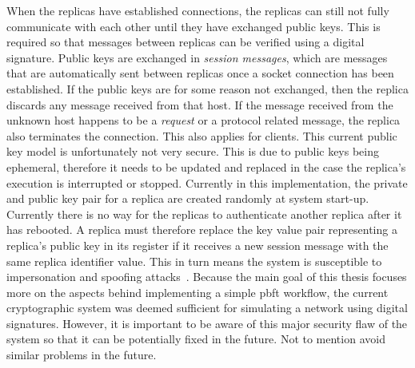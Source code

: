When the replicas have established connections, the replicas can still not fully communicate with each other until they have exchanged public keys. This is required so that messages between replicas can be verified using a digital signature. Public keys are exchanged in \emph{session messages}, which are messages that are automatically sent between replicas once a socket connection has been established. If the public keys are for some reason not exchanged, then the replica discards any message received from that host. If the message received from the unknown host happens to be a \emph{request} or a protocol related message, the replica also terminates the connection. This also applies for clients. This current public key model is unfortunately not very secure. This is due to public keys being ephemeral, therefore it needs to be updated and replaced in the case the replica’s execution is interrupted or stopped. Currently in this implementation, the private and public key pair for a replica are created randomly at system start-up. Currently there is no way for the replicas to authenticate another replica after it has rebooted. A replica must therefore replace the key value pair representing a replica's public key in its register if it receives a new session message with the same replica identifier value. This in turn means the system is susceptible to impersonation and spoofing attacks~\cite{WEB:spoofingAttack}. Because the main goal of this thesis focuses more on the aspects behind implementing a simple \ac{pbft} workflow, the current cryptographic system was deemed sufficient for simulating a network using digital signatures. However, it is important to be aware of this major security flaw of the system so that it can be potentially fixed in the future. Not to mention avoid similar problems in the future.


